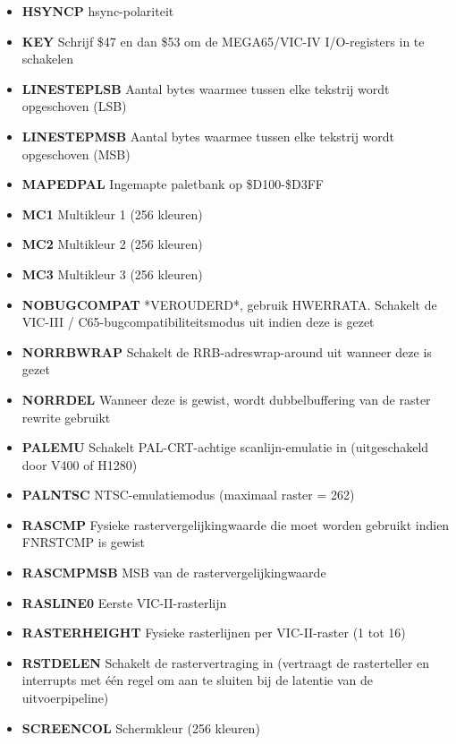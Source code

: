\begin{itemize}
\item{\bf{HSYNCP}} hsync-polariteit
\item{\bf{KEY}} Schrijf \$47 en dan \$53 om de MEGA65/VIC-IV I/O-registers in te schakelen
\item{\bf{LINESTEPLSB}} Aantal bytes waarmee tussen elke tekstrij wordt opgeschoven (LSB)
\item{\bf{LINESTEPMSB}} Aantal bytes waarmee tussen elke tekstrij wordt opgeschoven (MSB)
\item{\bf{MAPEDPAL}} Ingemapte paletbank op \$D100-\$D3FF
\item{\bf{MC1}} Multikleur 1 (256 kleuren)
\item{\bf{MC2}} Multikleur 2 (256 kleuren)
\item{\bf{MC3}} Multikleur 3 (256 kleuren)
\item{\bf{NOBUGCOMPAT}} *VEROUDERD*, gebruik HWERRATA. Schakelt de VIC-III / C65-bugcompatibiliteitsmodus uit indien deze is gezet
\item{\bf{NORRBWRAP}} Schakelt de RRB-adreswrap-around uit wanneer deze is gezet
\item{\bf{NORRDEL}} Wanneer deze is gewist, wordt dubbelbuffering van de raster rewrite gebruikt
\item{\bf{PALEMU}} Schakelt PAL-CRT-achtige scanlijn-emulatie in (uitgeschakeld door V400 of H1280)
\item{\bf{PALNTSC}} NTSC-emulatiemodus (maximaal raster = 262)
\item{\bf{RASCMP}} Fysieke rastervergelijkingwaarde die moet worden gebruikt indien FNRSTCMP is gewist
\item{\bf{RASCMPMSB}} MSB van de rastervergelijkingwaarde
\item{\bf{RASLINE0}} Eerste VIC-II-rasterlijn
\item{\bf{RASTERHEIGHT}} Fysieke rasterlijnen per VIC-II-raster (1 tot 16)
\item{\bf{RSTDELEN}} Schakelt de rastervertraging in (vertraagt de rasterteller en interrupts met één regel om aan te sluiten bij de latentie van de uitvoerpipeline)
\item{\bf{SCREENCOL}} Schermkleur (256 kleuren)

\end{itemize}
